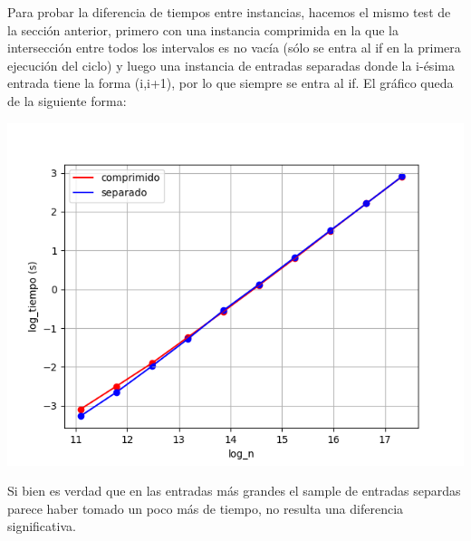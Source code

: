 Para probar la diferencia de tiempos entre instancias, hacemos el mismo test de la sección anterior, primero con una instancia comprimida en la que la intersección entre todos los intervalos es no vacía (sólo se entra al if en la primera ejecución del ciclo) y luego una instancia de entradas separadas donde la i-ésima entrada tiene la forma (i,i+1), por lo que siempre se entra al if. El gráfico queda de la siguiente forma:

\includegraphics{packages/Grafico_comprimido_vs_separado.png}

Si bien es verdad que en las entradas más grandes el sample de entradas separdas parece haber tomado un poco más de tiempo, no resulta una diferencia significativa.